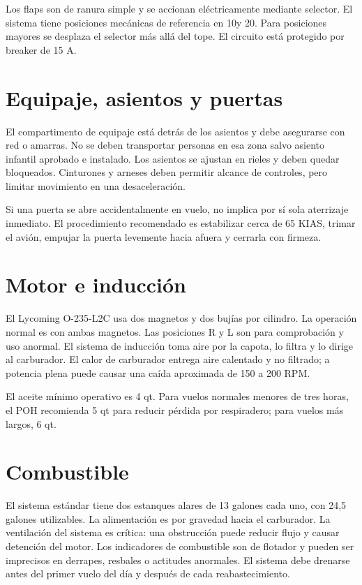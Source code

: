 \documentclass[11pt,oneside]{book}
\begin{document}
Los flaps son de ranura simple y se accionan eléctricamente mediante selector. El sistema tiene posiciones mecánicas de referencia en 10\textdegree y 20\textdegree. Para posiciones mayores se desplaza el selector más allá del tope. El circuito está protegido por breaker de 15 A.

\section{Equipaje, asientos y puertas}

El compartimento de equipaje está detrás de los asientos y debe asegurarse con red o amarras. No se deben transportar personas en esa zona salvo asiento infantil aprobado e instalado. Los asientos se ajustan en rieles y deben quedar bloqueados. Cinturones y arneses deben permitir alcance de controles, pero limitar movimiento en una desaceleración.

Si una puerta se abre accidentalmente en vuelo, no implica por sí sola aterrizaje inmediato. El procedimiento recomendado es estabilizar cerca de 65 KIAS, trimar el avión, empujar la puerta levemente hacia afuera y cerrarla con firmeza.

\section{Motor e inducción}

El Lycoming O-235-L2C usa dos magnetos y dos bujías por cilindro. La operación normal es con ambas magnetos. Las posiciones R y L son para comprobación y uso anormal. El sistema de inducción toma aire por la capota, lo filtra y lo dirige al carburador. El calor de carburador entrega aire calentado y no filtrado; a potencia plena puede causar una caída aproximada de 150 a 200 RPM.

El aceite mínimo operativo es 4 qt. Para vuelos normales menores de tres horas, el POH recomienda 5 qt para reducir pérdida por respiradero; para vuelos más largos, 6 qt.

\section{Combustible}

El sistema estándar tiene dos estanques alares de 13 galones cada uno, con 24,5 galones utilizables. La alimentación es por gravedad hacia el carburador. La ventilación del sistema es crítica: una obstrucción puede reducir flujo y causar detención del motor. Los indicadores de combustible son de flotador y pueden ser imprecisos en derrapes, resbales o actitudes anormales. El sistema debe drenarse antes del primer vuelo del día y después de cada reabastecimiento.
\end{document}
